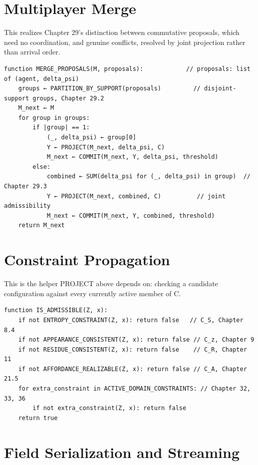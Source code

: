\section{Multiplayer Merge}

This realizes Chapter 29's distinction between commutative proposals, which need no coordination, and genuine conflicts, resolved by joint projection rather than arrival order.

\begin{Verbatim}[breaklines=true, breaksymbolleft={}, fontsize=\small]
function MERGE_PROPOSALS(M, proposals):            // proposals: list of (agent, delta_psi)
    groups ← PARTITION_BY_SUPPORT(proposals)         // disjoint-support groups, Chapter 29.2
    M_next ← M
    for group in groups:
        if |group| == 1:
            (_, delta_psi) ← group[0]
            Y ← PROJECT(M_next, delta_psi, C)
            M_next ← COMMIT(M_next, Y, delta_psi, threshold)
        else:
            combined ← SUM(delta_psi for (_, delta_psi) in group)  // Chapter 29.3
            Y ← PROJECT(M_next, combined, C)          // joint admissibility
            M_next ← COMMIT(M_next, Y, combined, threshold)
    return M_next
\end{Verbatim}

\section{Constraint Propagation}

This is the helper PROJECT above depends on: checking a candidate configuration against every currently active member of C.

\begin{Verbatim}[breaklines=true, breaksymbolleft={}, fontsize=\small]
function IS_ADMISSIBLE(Z, x):
    if not ENTROPY_CONSTRAINT(Z, x): return false   // C_S, Chapter 8.4
    if not APPEARANCE_CONSISTENT(Z, x): return false // C_z, Chapter 9
    if not RESIDUE_CONSISTENT(Z, x): return false    // C_R, Chapter 11
    if not AFFORDANCE_REALIZABLE(Z, x): return false // C_A, Chapter 21.5
    for extra_constraint in ACTIVE_DOMAIN_CONSTRAINTS: // Chapter 32, 33, 36
        if not extra_constraint(Z, x): return false
    return true
\end{Verbatim}

\section{Field Serialization and Streaming}

